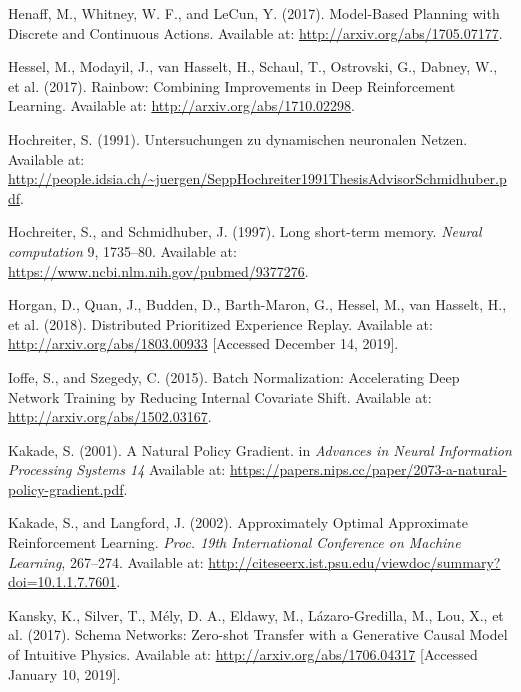 \documentclass[
  letterpaper,
  DIV=11,
  numbers=noendperiod]{scrreprt}
\newlength{\cslhangindent}
\newlength{\cslentryspacingunit} %
\newenvironment{CSLReferences}[2] %
 {%
  \setlength{\parindent}{0pt}
  \ifodd #1
  \let\oldpar\par
  \def\par{\hangindent=\cslhangindent\oldpar}
  \fi
  \setlength{\parskip}{#2\cslentryspacingunit}
 }%
 {}
\begin{document}
\begin{CSLReferences}{1}{0}
\leavevmode{}%
Henaff, M., Whitney, W. F., and LeCun, Y. (2017). Model-{Based Planning}
with {Discrete} and {Continuous Actions}. Available at:
\url{http://arxiv.org/abs/1705.07177}.

\leavevmode{}%
Hessel, M., Modayil, J., van Hasselt, H., Schaul, T., Ostrovski, G.,
Dabney, W., et al. (2017). Rainbow: {Combining Improvements} in {Deep
Reinforcement Learning}. Available at:
\url{http://arxiv.org/abs/1710.02298}.

\leavevmode{}%
Hochreiter, S. (1991). Untersuchungen zu dynamischen neuronalen
{Netzen}. Available at:
\url{http://people.idsia.ch/~juergen/SeppHochreiter1991ThesisAdvisorSchmidhuber.pdf}.

\leavevmode{}%
Hochreiter, S., and Schmidhuber, J. (1997). Long short-term memory.
\emph{Neural computation} 9, 1735--80. Available at:
\url{https://www.ncbi.nlm.nih.gov/pubmed/9377276}.

\leavevmode{}%
Horgan, D., Quan, J., Budden, D., Barth-Maron, G., Hessel, M., van
Hasselt, H., et al. (2018). Distributed {Prioritized Experience Replay}.
Available at: \url{http://arxiv.org/abs/1803.00933} {[}Accessed December
14, 2019{]}.

\leavevmode{}%
Ioffe, S., and Szegedy, C. (2015). Batch {Normalization}: {Accelerating
Deep Network Training} by {Reducing Internal Covariate Shift}. Available
at: \url{http://arxiv.org/abs/1502.03167}.

\leavevmode{}%
Kakade, S. (2001). A {Natural Policy Gradient}. in \emph{Advances in
{Neural Information Processing Systems} 14} Available at:
\url{https://papers.nips.cc/paper/2073-a-natural-policy-gradient.pdf}.

\leavevmode{}%
Kakade, S., and Langford, J. (2002). Approximately {Optimal Approximate
Reinforcement Learning}. \emph{Proc. 19th International Conference on
Machine Learning}, 267--274. Available at:
\url{http://citeseerx.ist.psu.edu/viewdoc/summary?doi=10.1.1.7.7601}.

\leavevmode{}%
Kansky, K., Silver, T., Mély, D. A., Eldawy, M., Lázaro-Gredilla, M.,
Lou, X., et al. (2017). Schema {Networks}: {Zero-shot Transfer} with a
{Generative Causal Model} of {Intuitive Physics}. Available at:
\url{http://arxiv.org/abs/1706.04317} {[}Accessed January 10, 2019{]}.


\end{CSLReferences}
\end{document}
